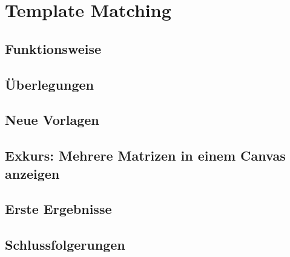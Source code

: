 \section{Template Matching}

\subsection{Funktionsweise}

\subsection{Überlegungen}

\subsection{Neue Vorlagen}

\subsection{Exkurs: Mehrere Matrizen in einem Canvas anzeigen}

\subsection{Erste Ergebnisse}

\subsection{Schlussfolgerungen}
